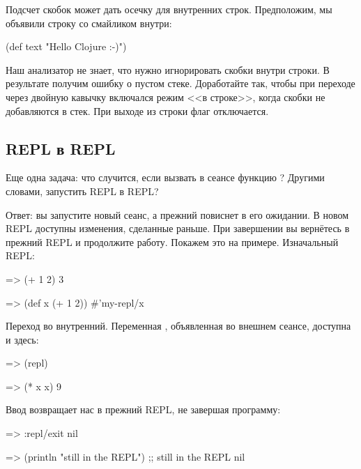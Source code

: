 Подсчет скобок может дать осечку для внутренних строк. Предположим, мы объявили строку со смайликом внутри:

\begin{english}
  \begin{clojure}
(def text "Hello Clojure :-)")
  \end{clojure}
\end{english}

Наш анализатор не знает, что нужно игнорировать скобки внутри строки. В результате получим ошибку о пустом стеке. Доработайте  так, чтобы при переходе через двойную кавычку включался режим <<в строке>>, когда скобки не добавляются в стек. При выходе из строки флаг отключается.

\subsection{REPL в REPL}


Еще одна задача: что случится, если вызвать в сеансе функцию ? Другими словами, запустить REPL в REPL?

Ответ: вы запустите новый сеанс, а прежний повиснет в его ожидании. В новом REPL доступны изменения, сделанные раньше. При завершении вы вернётесь в прежний REPL и продолжите работу. Покажем это на примере. Изначальный REPL:

\begin{english}
  \begin{clojure/lines}
=> (+ 1 2)
3

=> (def x (+ 1 2))
#'my-repl/x
  \end{clojure/lines}
\end{english}

\pagebreaklarge

Переход во внутренний. Переменная , объявленная во внешнем сеансе, доступна и здесь:

\begin{english}
  \begin{clojure}
=> (repl)

=> (* x x)
9
  \end{clojure}
\end{english}

Ввод  возвращает нас в прежний REPL, не завершая программу:

\begin{english}
  \begin{clojure}
=> :repl/exit
nil

=> (println "still in the REPL")
;; still in the REPL
nil
  \end{clojure}
\end{english}

